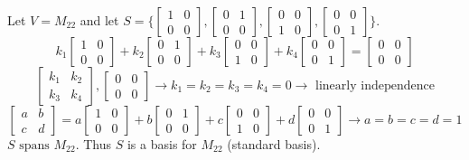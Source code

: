 \documentclass[12pt]{article}
\begin{document}
\begin{example} Let $V = M_{22}$ and let $S = \{\begin{bmatrix} 1 & 0 \\ 0 & 0 \end{bmatrix}, \begin{bmatrix} 0 & 1 \\ 0 & 0 \end{bmatrix}, \begin{bmatrix} 0 & 0 \\ 1 & 0 \end{bmatrix}, \begin{bmatrix} 0 & 0 \\ 0 & 1 \end{bmatrix}\}$. $$k_1\begin{bmatrix} 1 & 0 \\ 0 & 0 \end{bmatrix} + k_2\begin{bmatrix} 0 & 1 \\ 0 & 0 \end{bmatrix} + k_3\begin{bmatrix} 0 & 0 \\ 1 & 0 \end{bmatrix} + k_4\begin{bmatrix} 0 & 0 \\ 0 & 1 \end{bmatrix} = \begin{bmatrix} 0 & 0 \\ 0 & 0 \end{bmatrix} $$ 
$$ \begin{bmatrix} k_1 & k_2 \\ k_3 & k_4 \end{bmatrix}, \begin{bmatrix} 0 & 0 \\ 0 & 0 \end{bmatrix} \rightarrow k_1 = k_2 = k_3 = k_4 = 0 \rightarrow \text{ linearly independence} $$ $$ \begin{bmatrix} a & b \\ c & d \end{bmatrix} = a\begin{bmatrix} 1 & 0 \\ 0 & 0 \end{bmatrix} + b\begin{bmatrix} 0 & 1 \\ 0 & 0 \end{bmatrix} + c\begin{bmatrix} 0 & 0 \\ 1 & 0 \end{bmatrix} + d\begin{bmatrix} 0 & 0 \\ 0 & 1 \end{bmatrix} \rightarrow a = b = c = d = 1 $$ $ S \text{ spans } M_{22} $. Thus $S$ is a basis for $M_{22}$ (standard basis). \end{example}
\end{document}
